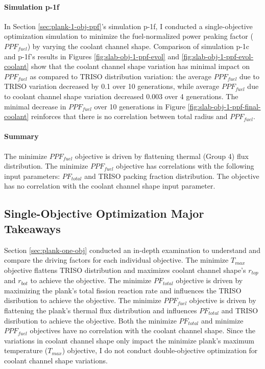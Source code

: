 \paragraph{Simulation p-1f}
In Section \ref{sec:plank-1-obj-ppf}'s simulation p-1f, I conducted a single-objective 
optimization simulation to minimize the fuel-normalized power peaking factor ($PPF_{fuel}$) 
by varying the coolant channel shape.
Comparison of simulation p-1c and p-1f's results in Figures 
\ref{fig:slab-obj-1-ppf-evol} and \ref{fig:slab-obj-1-ppf-evol-coolant} 
show that the coolant channel shape variation has minimal impact on $PPF_{fuel}$ as 
compared to \gls{TRISO} distribution variation: the average $PPF_{fuel}$ due 
to \gls{TRISO} variation decreased by 0.1 over 10 generations, while average 
$PPF_{fuel}$ due to coolant channel shape variation decreased 0.003 over 
4 generations. 
The minimal decrease in $PPF_{fuel}$ over 10 generations in Figure 
\ref{fig:slab-obj-1-ppf-final-coolant} reinforces that there is 
no correlation between total radius and $PPF_{fuel}$. 

\paragraph{Summary}
The minimize $PPF_{fuel}$ objective is driven by flattening thermal (Group 4) flux 
distribution. 
The minimize $PPF_{fuel}$ objective has correlations with the following input parameters: 
$PF_{total}$ and TRISO packing fraction distribution. 
The objective has no correlation with the coolant channel shape input parameter.

\subsection{Single-Objective Optimization Major Takeaways}
Section \ref{sec:plank-one-obj} conducted an in-depth examination to understand 
and compare the driving factors for each individual objective. 
The minimize $T_{max}$ objective flattens TRISO distribution and maximizes coolant 
channel shape's $r_{top}$ and $r_{bot}$ to achieve the objective. 
The minimize $PF_{total}$ objective is driven by maximizing the plank's total fission 
reaction rate and influences the TRISO disribution to achieve the objective. 
The minimize $PPF_{fuel}$ objective is driven by flattening the plank's thermal flux
distribution and influences $PF_{total}$ and TRISO disribution to achieve the objective. 
Both the minimize $PF_{total}$ and minimize $PPF_{fuel}$ objectives have no correlation 
with the coolant channel shape. 
Since the variations in coolant channel shape only impact the minimize plank's maximum 
temperature ($T_{max}$) objective, I do not conduct double-objective 
optimization for coolant channel shape variations.  

